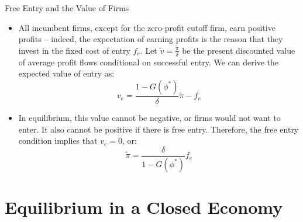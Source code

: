 \documentclass[aspectratio=169]{beamer}
\begin{document}
\begin{frame}{Free Entry and the Value of Firms}

\begin{itemize}
    \item<1-> All incumbent firms, except for the zero-profit cutoff firm, earn positive profits – indeed, the expectation of earning profits is the reason that they invest in the fixed cost of entry $ f_{e} $.  Let $ \tilde{v} = \frac{\tilde{\pi}}{\delta} $ be the present discounted value of average profit flows conditional on successful entry.  We can derive the expected value of entry as:
    \begin{equation*}
        v_{e} = \frac{1 - G\left( \phi^{*} \right)}{\delta} \tilde{\pi} - f_{e}
    \end{equation*}
    \item<2-> In equilibrium, this value cannot be negative, or firms would not want to enter.  It also cannot be positive if there is free entry.  Therefore, the free entry condition implies that $ v_{e} = 0 $, or:
    \begin{equation}
        \tilde{\pi} = \frac{\delta}{1 - G\left( \phi^{*} \right)} f_{e}
        \label{eq:freeentrycondition}
    \end{equation}
\end{itemize}
    
\end{frame}


\section{Equilibrium in a Closed Economy}

\end{document}
